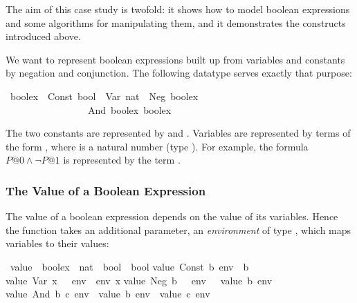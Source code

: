 %
\begin{isabellebody}%
\def\isabellecontext{Ifexpr}%
%
%
\begin{isamarkuptext}%
\label{sec:boolex}
The aim of this case study is twofold: it shows how to model boolean
expressions and some algorithms for manipulating them, and it demonstrates
the constructs introduced above.%
\end{isamarkuptext}%
%
%
\begin{isamarkuptext}%
We want to represent boolean expressions built up from variables and
constants by negation and conjunction. The following datatype serves exactly
that purpose:%
\end{isamarkuptext}%
\ boolex\ {\isacharequal}\ Const\ bool\ {\isacharbar}\ Var\ nat\ {\isacharbar}\ Neg\ boolex\isanewline
\ \ \ \ \ \ \ \ \ \ \ \ \ \ \ \ {\isacharbar}\ And\ boolex\ boolex%
\begin{isamarkuptext}%
\noindent
The two constants are represented by  and
. Variables are represented by terms of the form
, where  is a natural number (type ).
For example, the formula $P@0 \land \neg P@1$ is represented by the term
.

\subsubsection{The Value of a Boolean Expression}

The value of a boolean expression depends on the value of its variables.
Hence the function  takes an additional parameter, an
\emph{environment} of type , which maps variables to their
values:%
\end{isamarkuptext}%
\ value\ {\isacharcolon}{\isacharcolon}\ {\isachardoublequote}boolex\ {\isasymRightarrow}\ {\isacharparenleft}nat\ {\isasymRightarrow}\ bool{\isacharparenright}\ {\isasymRightarrow}\ bool{\isachardoublequote}\isanewline
{}\isanewline
{\isachardoublequote}value\ {\isacharparenleft}Const\ b{\isacharparenright}\ env\ {\isacharequal}\ b{\isachardoublequote}\isanewline
{\isachardoublequote}value\ {\isacharparenleft}Var\ x{\isacharparenright}\ \ \ env\ {\isacharequal}\ env\ x{\isachardoublequote}\isanewline
{\isachardoublequote}value\ {\isacharparenleft}Neg\ b{\isacharparenright}\ \ \ env\ {\isacharequal}\ {\isacharparenleft}{\isasymnot}\ value\ b\ env{\isacharparenright}{\isachardoublequote}\isanewline
{\isachardoublequote}value\ {\isacharparenleft}And\ b\ c{\isacharparenright}\ env\ {\isacharequal}\ {\isacharparenleft}value\ b\ env\ {\isasymand}\ value\ c\ env{\isacharparenright}{\isachardoublequote}%
\begin{isamarkuptext}%
\noindent

\end{isamarkuptext}
\end{isabellebody}
